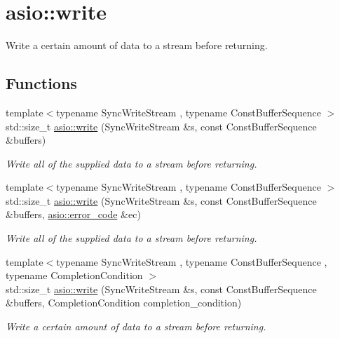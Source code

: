 \hypertarget{group__write}{}\section{asio\+:\+:write}
\label{group__write}


Write a certain amount of data to a stream before returning.  


\subsection*{Functions}
\begin{DoxyCompactItemize}
\item 
{\footnotesize template$<$typename Sync\+Write\+Stream , typename Const\+Buffer\+Sequence $>$ }\\std\+::size\+\_\+t \hyperlink{group__write_gab293266ad69e271fdda0ff6f8086fb5c}{asio\+::write} (Sync\+Write\+Stream \&s, const Const\+Buffer\+Sequence \&buffers)
\begin{DoxyCompactList}\small\item\em Write all of the supplied data to a stream before returning. \end{DoxyCompactList}\item 
{\footnotesize template$<$typename Sync\+Write\+Stream , typename Const\+Buffer\+Sequence $>$ }\\std\+::size\+\_\+t \hyperlink{group__write_gacfe88679a7a77cbb22870cafa20414cb}{asio\+::write} (Sync\+Write\+Stream \&s, const Const\+Buffer\+Sequence \&buffers, \hyperlink{classasio_1_1error__code}{asio\+::error\+\_\+code} \&ec)
\begin{DoxyCompactList}\small\item\em Write all of the supplied data to a stream before returning. \end{DoxyCompactList}\item 
{\footnotesize template$<$typename Sync\+Write\+Stream , typename Const\+Buffer\+Sequence , typename Completion\+Condition $>$ }\\std\+::size\+\_\+t \hyperlink{group__write_ga646f54905cf959c2c16f221a2e1c1ce7}{asio\+::write} (Sync\+Write\+Stream \&s, const Const\+Buffer\+Sequence \&buffers, Completion\+Condition completion\+\_\+condition)
\begin{DoxyCompactList}\small\item\em Write a certain amount of data to a stream before returning. \end{DoxyCompactList}\item 

\end{DoxyCompactItemize}
